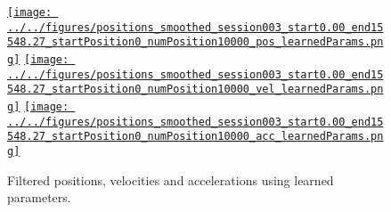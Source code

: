 \documentclass[12pt]{article}
\begin{document}
\begin{figure}
    \begin{center}

        \href{http://www.gatsby.ucl.ac.uk/~rapela/fwg/reports/learning/figures/positions_smoothed_session003_start0.00_end15548.27_startPosition0_numPosition10000_pos_learnedParams.html}{\texttt{[image: ../../figures/positions\_smoothed\_session003\_start0.00\_end15548.27\_startPosition0\_numPosition10000\_pos\_learnedParams.png]}}
        \href{http://www.gatsby.ucl.ac.uk/~rapela/fwg/reports/learning/figures/positions_smoothed_session003_start0.00_end15548.27_startPosition0_numPosition10000_vel_learnedParams.html}{\texttt{[image: ../../figures/positions\_smoothed\_session003\_start0.00\_end15548.27\_startPosition0\_numPosition10000\_vel\_learnedParams.png]}}
        \href{http://www.gatsby.ucl.ac.uk/~rapela/fwg/reports/learning/figures/positions_smoothed_session003_start0.00_end15548.27_startPosition0_numPosition10000_acc_learnedParams.html}{\texttt{[image: ../../figures/positions\_smoothed\_session003\_start0.00\_end15548.27\_startPosition0\_numPosition10000\_acc\_learnedParams.png]}}

        \caption{Filtered positions, velocities and accelerations using
        learned parameters.}

        \label{fig:real_learnedParams}

    \end{center}
\end{figure}
\end{document}
